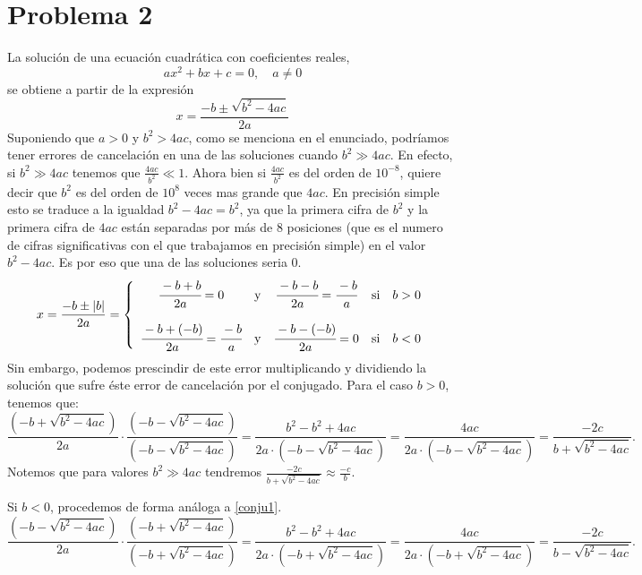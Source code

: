 \documentclass[a4paper]{article}
\begin{document}
\section*{Problema 2}
La solución de una ecuación cuadrática con coeficientes reales, $$ax^2+bx+c=0,\quad a\ne0$$ se obtiene a partir de la expresión 
\begin{equation}
    x=\frac{-b\pm\sqrt{b^2-4ac}}{2a}
    \label{2}
\end{equation}
Suponiendo que $a>0$ y $b^2>4ac$, como se menciona en el enunciado, podríamos tener errores de cancelación en una de las soluciones cuando $b^2\gg 4ac$. En efecto, si $b^2\gg4ac$ tenemos que $\frac{4ac}{b^2}\ll1$. Ahora bien si $\frac{4ac}{b^2}$ es del orden de $10^{-8}$, quiere decir que $b^2$ es del orden de $10^8$ veces mas grande que $4ac$. En precisión simple esto se traduce a la igualdad $b^2-4ac=b^2$, ya que la primera cifra de $b^2$ y la primera cifra de $4ac$ están separadas por más de 8 posiciones (que es el numero de cifras significativas con el que trabajamos en precisión simple) en el valor $b^2-4ac$. Es por eso que una de las soluciones seria 0.
\begin{equation}
x=\frac{-b\pm|b|}{2a}=\left\{\begin{array}{ccccc} \cfrac{-b+b}{2a}=0 & \text{y} & \cfrac{-b-b}{2a}=\cfrac{-b}{a} & \text{si} & b>0\\\\ \cfrac{-b+(-b)}{2a}=\cfrac{-b}{a} & \text{y} & \cfrac{-b-(-b)}{2a}=0 & \text{si} & b<0
\end{array}\right.
\end{equation}
Sin embargo, podemos prescindir de este error multiplicando y dividiendo la solución que sufre éste error de cancelación por el conjugado. Para el caso $b>0$, tenemos que:
\begin{equation}
\frac{(-b+\sqrt{b^2-4ac})}{2a}\cdot\frac{(-b-\sqrt{b^2-4ac})}{(-b-\sqrt{b^2-4ac})}=\frac{b^2-b^2+4ac}{2a\cdot(-b-\sqrt{b^2-4ac})}=\frac{4ac}{2a\cdot(-b-\sqrt{b^2-4ac})}=\frac{-2c}{b+\sqrt{b^2-4ac}}.	
\label{conju1}
\end{equation} 
Notemos que para valores $b^2\gg4ac$ tendremos $\displaystyle\frac{-2c}{b+\sqrt{b^2-4ac}}\approx \frac{-c}{b}$.\par Si $b<0$, procedemos de forma análoga a \eqref{conju1}.
\begin{equation}
\frac{(-b-\sqrt{b^2-4ac})}{2a}\cdot\frac{(-b+\sqrt{b^2-4ac})}{(-b+\sqrt{b^2-4ac})}=\frac{b^2-b^2+4ac}{2a\cdot(-b+\sqrt{b^2-4ac})}=\frac{4ac}{2a\cdot(-b+\sqrt{b^2-4ac})}=\frac{-2c}{b-\sqrt{b^2-4ac}}	.
\label{conju2}
\end{equation}
\end{document}
